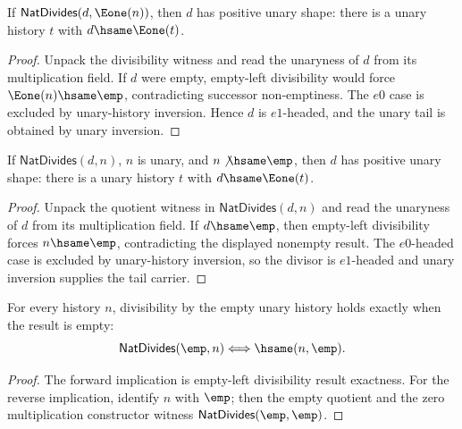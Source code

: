 \begin{theorem}
\label{thm:natdivides-successor-result-divisor-positive-shape}
If \(\mathsf{NatDivides}(d,\Eone(n))\), then \(d\) has positive unary shape:
there is a unary history \(t\) with \(d\hsame\Eone(t)\).
\end{theorem}
\begin{proof}
Unpack the divisibility witness and read the unaryness of \(d\) from its
multiplication field. If \(d\) were empty, empty-left divisibility would force
\(\Eone(n)\hsame\emp\), contradicting successor non-emptiness. The \(e0\)
case is excluded by unary-history inversion. Hence \(d\) is \(e1\)-headed, and
the unary tail is obtained by unary inversion.
\end{proof}

\begin{theorem}
\label{thm:nat-divides-nonempty-result-divisor-positive-shape}
If \(\mathsf{NatDivides}(d,n)\), \(n\) is unary, and
\(n\not\hsame\emp\), then \(d\) has positive unary shape: there is a unary
history \(t\) with \(d\hsame\Eone(t)\).
\end{theorem}
\begin{proof}
Unpack the quotient witness in \(\mathsf{NatDivides}(d,n)\) and read the
unaryness of \(d\) from its multiplication field. If \(d\hsame\emp\), then
empty-left divisibility forces \(n\hsame\emp\), contradicting the displayed
nonempty result. The \(e0\)-headed case is excluded by unary-history inversion,
so the divisor is \(e1\)-headed and unary inversion supplies the tail carrier.
\end{proof}

\begin{theorem}
\label{thm:nat-divides-empty-left-iff}
For every history $n$, divisibility by the empty unary history holds exactly
when the result is empty:
$$
\mathsf{NatDivides}(\emp,n)\Longleftrightarrow \hsame(n,\emp).
$$
\end{theorem}
\begin{proof}
The forward implication is empty-left divisibility result exactness. For the
reverse implication, identify $n$ with $\emp$; then the empty quotient and the
zero multiplication constructor witness $\mathsf{NatDivides}(\emp,\emp)$.
\end{proof}

